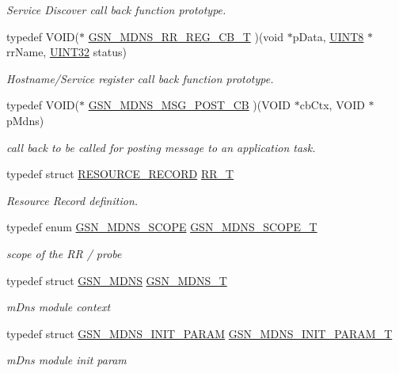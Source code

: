 \begin{DoxyCompactItemize}
\begin{DoxyCompactList}\small\item\em Service Discover call back function prototype. \end{DoxyCompactList}\item 
typedef VOID($\ast$ \hyperlink{a00668_ga9c52fae5548745f14ef4e76fb05c2526}{GSN\_\-MDNS\_\-RR\_\-REG\_\-CB\_\-T} )(void $\ast$pData, \hyperlink{a00660_gab27e9918b538ce9d8ca692479b375b6a}{UINT8} $\ast$rrName, \hyperlink{a00660_gae1e6edbbc26d6fbc71a90190d0266018}{UINT32} status)
\begin{DoxyCompactList}\small\item\em Hostname/Service register call back function prototype. \end{DoxyCompactList}\item 
typedef VOID($\ast$ \hyperlink{a00668_ga9bb465f57992212c58689c8cf593e0e7}{GSN\_\-MDNS\_\-MSG\_\-POST\_\-CB} )(VOID $\ast$cbCtx, VOID $\ast$pMdns)
\begin{DoxyCompactList}\small\item\em call back to be called for posting message to an application task. \end{DoxyCompactList}\item 
typedef struct \hyperlink{a00457}{RESOURCE\_\-RECORD} \hyperlink{a00668_ga049805b69be0964873d9f51f9f783813}{RR\_\-T}
\begin{DoxyCompactList}\small\item\em Resource Record definition. \end{DoxyCompactList}\item 
typedef enum \hyperlink{a00668_gabcc090f962c26d23957861a30b6bf166}{GSN\_\-MDNS\_\-SCOPE} \hyperlink{a00668_ga628a2f0345628c6bb12ee21fee3790db}{GSN\_\-MDNS\_\-SCOPE\_\-T}
\begin{DoxyCompactList}\small\item\em scope of the RR / probe \end{DoxyCompactList}\item 
typedef struct \hyperlink{a00140}{GSN\_\-MDNS} \hyperlink{a00668_gaaa3d044b4a5b3e8b4817fca5ad460e05}{GSN\_\-MDNS\_\-T}
\begin{DoxyCompactList}\small\item\em mDns module context \end{DoxyCompactList}\item 
typedef struct \hyperlink{a00144}{GSN\_\-MDNS\_\-INIT\_\-PARAM} \hyperlink{a00668_ga1ef3eac492349f066a53f0d1760152ee}{GSN\_\-MDNS\_\-INIT\_\-PARAM\_\-T}
\begin{DoxyCompactList}\small\item\em mDns module init param \end{DoxyCompactList}\item 

\end{DoxyCompactItemize}
